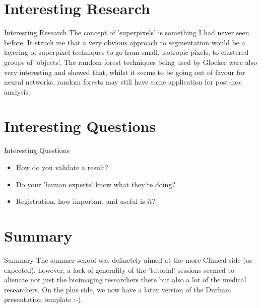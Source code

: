\documentclass[11pt]{beamer}
\def\Bodies{DBIL}%
\begin{document}
\section{Interesting Research}
\begin{frame}{Interesting Research}
	The concept of 'superpixels' is something I had never seen before. It struck me that a very obvious approach to segmentation would be a layering of superpixel techniques to go from small, isotropic pixels, to clustered groups of 'objects'.
	The random forest techniques being used by Glocker were also very interesting and showed that, whilst it seems to be going out of favour for neural networks, random forests may still have some application for post-hoc analysis.
\end{frame}

\section{Interesting Questions}
\begin{frame}{Interesting Questions}
	\begin{itemize}
	\item How do you validate a result?
	\item Do your 'human experts' know what they're doing?
	\item Registration, how important and useful is it?
	\end{itemize}
\end{frame}

\section{Summary}
\begin{frame}{Summary}
	The summer school was definetely aimed at the more Clinical side (as expected); however, a lack of generality of the 'tutorial' sessions seemed to alienate not just the bioimaging researchers there but also a lot of the medical researchers. On the plus side, we now have a latex version of the Durham presentation template :-).
\end{frame}

\def\Bodies{EPSRC,BBSRC,RS}%
\def\Group{Boguslaw Obara*,Chris Willcocks*,Phil Jackson*,Cidgem Sazak*,Haifa Al-Hasson,Amar Nasrulloh,Shuaa Alharbi}%
\def\Collaborators{John Girkin,Roy Quinlan,Mike Deeks,Patrick Hussey,Tim Hawkins,Phillipe Laissue,Jonathon Taylor}%
\def\Thanks{BSI}
\makeacknowledgements

\end{document}

